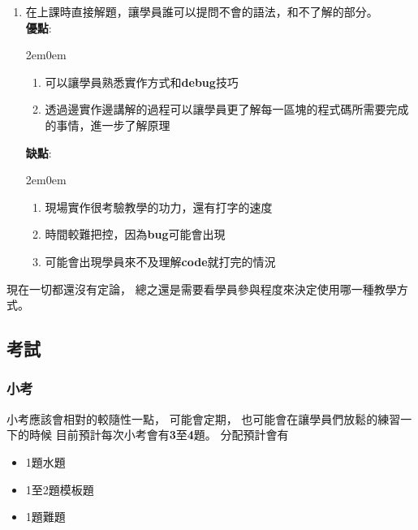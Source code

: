 \documentclass[12pt,oneside]{article}
\begin{document}
\begin{adjustwidth}{2em}{0em}
\begin{enumerate}
    \vspace*{2em}
    \item 
        在上課時直接解題，讓學員誰可以提問不會的語法，和不了解的部分。\\
        \textbf{優點}: 
        \begin{adjustwidth} {2em}{0em}
        \begin{enumerate}
            \item 可以讓學員熟悉實作方式和\textbf{debug}技巧
            \item 透過邊實作邊講解的過程可以讓學員更了解每一區塊的程式碼所需要完成的事情，進一步了解原理
        \end{enumerate}
        \end{adjustwidth}


        \textbf{缺點}: 
        \begin{adjustwidth} {2em}{0em}
        \begin{enumerate}
            \item
                現場實作很考驗教學的功力，還有打字的速度
            \item 
                時間較難把控，因為\textbf{bug}可能會出現
            \item 
                可能會出現學員來不及理解\textbf{code}就打完的情況
        \end{enumerate}
        \end{adjustwidth}
\end{enumerate}
\end{adjustwidth}

\vspace*{2em}
現在一切都還沒有定論，
總之還是需要看學員參與程度來決定使用哪一種教學方式。

\clearpage
\subsection{考試}


\subsubsection{小考}

小考應該會相對的較隨性一點，
可能會定期，
也可能會在讓學員們放鬆的練習一下的時候
目前預計每次小考會有\textbf{3}至\textbf{4}題。
分配預計會有
\begin{adjustwidth}{2em}{0em}
\begin{itemize}
    \item 1題水題
    \item 1至2題模板題
    \item 1題難題
\end{itemize}
\end{adjustwidth}
\end{document}
